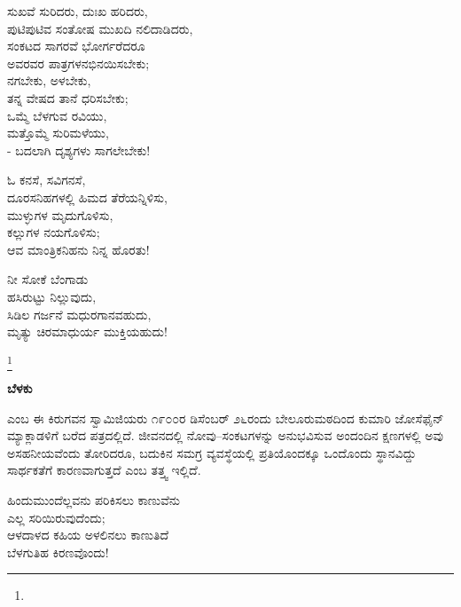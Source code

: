 \begin{myquote}
ಸುಖವೆ ಸುರಿದರು, ದುಃಖ ಹರಿದರು,\\ಪುಟಿಪುಟಿವ ಸಂತೋಷ ಮುಖದಿ ನಲಿದಾಡಿದರು,\\ಸಂಕಟದ ಸಾಗರವೆ ಭೋರ್ಗರೆದರೂ\\ಅವರವರ ಪಾತ್ರಗಳನಭಿನಯಿಸಬೇಕು;\\ನಗಬೇಕು, ಅಳಬೇಕು,\\ತನ್ನ ವೇಷದ ತಾನೆ ಧರಿಸಬೇಕು;\\ಒಮ್ಮೆ ಬೆಳಗುವ ರವಿಯು,\\ಮತ್ತೊಮ್ಮೆ ಸುರಿಮಳೆಯು,\\- ಬದಲಾಗಿ ದೃಶ್ಯಗಳು ಸಾಗಲೇಬೇಕು!
\end{myquote}

\begin{myquote}
ಓ ಕನಸೆ, ಸವಿಗನಸೆ,\\ದೂರಸನಿಹಗಳಲ್ಲಿ ಹಿಮದ ತೆರೆಯನ್ನಿಳಿಸು,\\ಮುಳ್ಳುಗಳ ಮೃದುಗೊಳಿಸು,\\ಕಲ್ಲುಗಳ ನಯಗೊಳಿಸು;\\ಆವ ಮಾಂತ್ರಿಕನಿಹನು ನಿನ್ನ ಹೊರತು!
\end{myquote}

\begin{myquote}
ನೀ ಸೋಕೆ ಬೆಂಗಾಡು\\ಹಸಿರುಟ್ಟು ನಿಲ್ಲುವುದು,\\ಸಿಡಿಲ ಗರ್ಜನೆ ಮಧುರಗಾನವಹುದು,\\ಮೃತ್ಯು ಚಿರಮಾಧುರ್ಯ ಮುಕ್ತಿಯಹುದು!
\end{myquote}

\protect\footnote{}

\begin{myquote}
\end{myquote}

\begin{center}
\textbf{ಬೆಳಕು}
\end{center}

 ಎಂಬ ಈ ಕಿರುಗವನ ಸ್ವಾಮಿಜಿಯರು ೧೯೦೦ರ ಡಿಸೆಂಬರ್ ೨೬ರಂದು ಬೇಲೂರುಮಠದಿಂದ ಕುಮಾರಿ ಜೋಸೆಫೈನ್ ಮ್ಯಾಕ್ಲಾಡಳಿಗೆ ಬರೆದ ಪತ್ರದಲ್ಲಿದೆ. ಜೀವನದಲ್ಲಿ ನೋವು–ಸಂಕಟಗಳನ್ನು ಅನುಭವಿಸುವ ಅಂದಂದಿನ ಕ್ಷಣಗಳಲ್ಲಿ ಅವು ಅಸಹನೀಯವೆಂದು ತೋರಿದರೂ, ಬದುಕಿನ ಸಮಗ್ರ ವ್ಯವಸ್ಥೆಯಲ್ಲಿ ಪ್ರತಿಯೊಂದಕ್ಕೂ ಒಂದೊಂದು ಸ್ಥಾನವಿದ್ದು ಸಾರ್ಥಕತೆಗೆ ಕಾರಣವಾಗುತ್ತದೆ ಎಂಬ ತತ್ತ್ವ ಇಲ್ಲಿದೆ.

\begin{myquote}
ಹಿಂದುಮುಂದೆಲ್ಲವನು ಪರಿಕಿಸಲು ಕಾಣುವೆನು\\ಎಲ್ಲ ಸರಿಯಿರುವುದೆಂದು;\\ಆಳದಾಳದ ಕಹಿಯ ಅಳಲಿನಲು ಕಾಣುತಿದೆ\\ಬೆಳಗುತಿಹ ಕಿರಣವೊಂದು!
\end{myquote}

